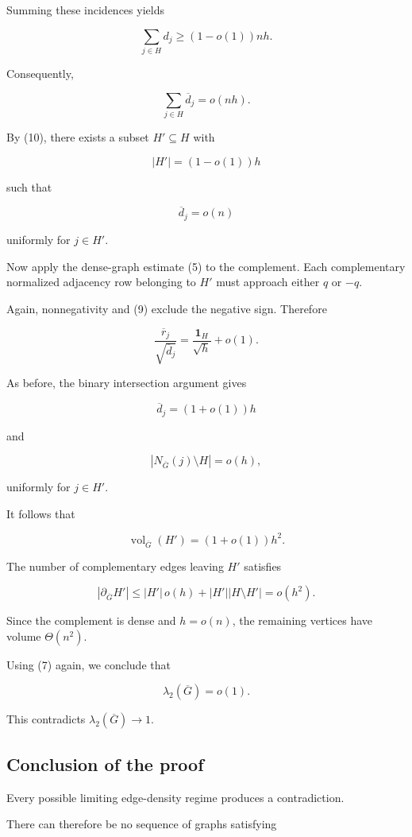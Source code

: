 \documentclass[11pt]{article}
\begin{document}
Summing these incidences yields

\[
\sum_{j\in H}d_j\geq(1-o(1))nh.
\]

Consequently,

\[
\sum_{j\in H}\overline d_j=o(nh).
\tag{10}
\]

By (10), there exists a subset \(H'\subseteq H\) with

\[
|H'|=(1-o(1))h
\]

such that

\[
\overline d_j=o(n)
\]

uniformly for \(j\in H'\).

Now apply the dense-graph estimate (5) to the complement. Each complementary normalized adjacency row belonging to \(H'\) must approach either \(q\) or \(-q\).

Again, nonnegativity and (9) exclude the negative sign. Therefore

\[
\frac{\overline r_j}{\sqrt{\overline d_j}}
=
\frac{\mathbf1_H}{\sqrt h}+o(1).
\]

As before, the binary intersection argument gives

\[
\overline d_j=(1+o(1))h
\]

and

\[
|N_{\overline G}(j)\setminus H|=o(h),
\]

uniformly for \(j\in H'\).

It follows that

\[
\operatorname{vol}_{\overline G}(H')
=(1+o(1))h^2.
\]

The number of complementary edges leaving \(H'\) satisfies

\[
|\partial_{\overline G}H'|
\leq
|H'|\,o(h)+|H'||H\setminus H'|
=o(h^2).
\]

Since the complement is dense and \(h=o(n)\), the remaining vertices have volume \(\Theta(n^2)\).

Using (7) again, we conclude that

\[
\lambda_2(\overline G)=o(1).
\]

This contradicts \(\lambda_2(\overline G)\to1\).

\subsection{Conclusion of the proof}

Every possible limiting edge-density regime produces a contradiction.

There can therefore be no sequence of graphs satisfying
\end{document}
